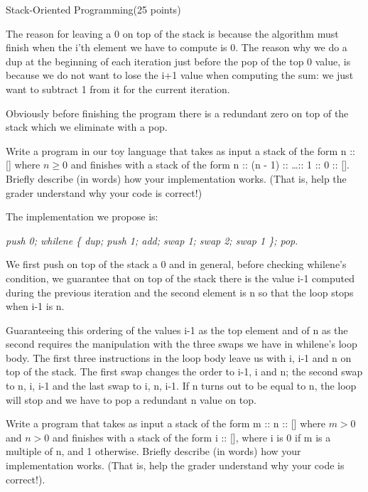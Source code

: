 \documentclass{article}
\begin{document}
\begin{question}{Stack-Oriented Programming}{(25 points)}
\begin{subquestion}
 The reason for leaving a 0 on top of the stack is because the algorithm must finish when the i'th element we have to compute is 0. The reason why we do a dup at the beginning of each iteration just before the pop of the top 0 value, is because we do not want to lose the i+1 value when computing the sum: we just want to subtract 1 from it for the current iteration.
 
 Obviously before finishing the program there is a redundant zero on top of the stack which we eliminate with a pop. 


  \end{subquestion}
  
  \begin{subquestion}
    Write a program in our toy language that takes as input a stack of the form n :: [] where $n \geq 0$ and
   finishes with a stack of the form n :: (n - 1) :: \dots :: 1 :: 0 :: []. Briefly describe (in words) how your
   implementation works. (That is, help the grader understand why your code is correct!)
   
   The implementation we propose is:
   
   \emph{push 0; whilene \{ dup; push 1; add; swap 1; swap 2; swap 1 \}; pop}.
   
   We first push on top of the stack a 0 and in general, before checking whilene's condition, we guarantee that on top of the stack there is the value i-1 computed during the previous iteration and the second element is n so that the loop stops when i-1 is n.
   
   Guaranteeing this ordering of the values i-1 as the top element and of n as the second requires the manipulation with the three swaps we have in whilene's loop body. The first three instructions in the loop body leave us with i, i-1 and n on top of the stack. The first swap changes the order to i-1, i and n; the second swap to n, i, i-1 and the last swap to i, n, i-1. If n turns out to be equal to n, the loop will stop and we have to pop a redundant n value on top.
    
  \end{subquestion}
  
  
  
  \begin{subquestion}
     Write a program that takes as input a stack of the form m :: n :: [] where $m \gt 0$ and $n \gt 0$ and finishes
    with a stack of the form i :: [], where i is 0 if m is a multiple of n, and 1 otherwise. Briefly describe
    (in words) how your implementation works. (That is, help the grader understand why your code is
    correct!).
    

\end{subquestion}
\end{question}
\end{document}
